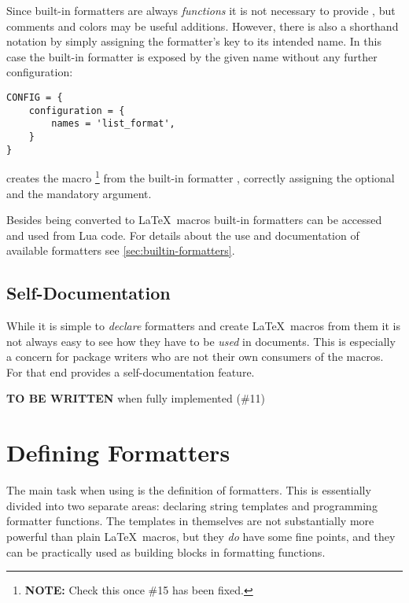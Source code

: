 \documentclass{scrartcl}
\begin{document}
Since built-in formatters are always \emph{functions} it is not necessary to
provide , but comments and colors may be useful additions. However,
there is also a shorthand notation by simply assigning the formatter's key to
its intended name.  In this case the built-in formatter is exposed by the given
name without any further configuration:

\begin{verbatim}
CONFIG = {
    configuration = {
        names = 'list_format',
    }
}
\end{verbatim}

\noindent creates the macro %
\footnote{\textbf{NOTE:} Check this once \#15 has been fixed.}
from the built-in formatter , correctly assigning the
optional and the mandatory  argument.

Besides being converted to \LaTeX\ macros built-in formatters can be accessed
and used from Lua code.  For details about the use and documentation of
available formatters see \vref{sec:builtin-formatters}.


\subsection{Self-Documentation}
\label{sec:self-documentation}

While it is simple to \emph{declare} formatters and create \LaTeX\ macros from
them it is not always easy to see how they have to be \emph{used} in documents.
This is especially a concern for package writers who are not their own consumers
of the macros.  For that end  provides a
self-documentation feature.

\bigskip

\noindent
\textbf{TO BE WRITTEN} when fully implemented (\#11)



\section{Defining Formatters}
\label{sec:defining-formatters}

The main task when using  is the definition of formatters.
This is essentially divided into two separate areas: declaring string templates
and programming formatter functions.  The templates in themselves are not
substantially more powerful than plain \LaTeX\ macros, but they \emph{do} have
some fine points, and they can be practically used as building blocks in
formatting functions.
\end{document}
